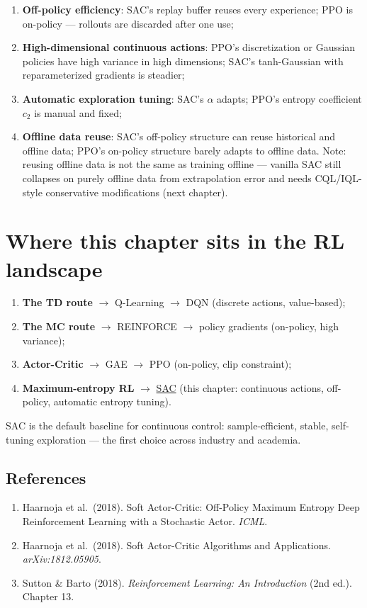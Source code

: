 \documentclass{article}
\begin{document}
\begin{enumerate}
  \item \textbf{Off-policy efficiency}: SAC's replay buffer reuses every experience; PPO is on-policy --- rollouts are discarded after one use;
  \item \textbf{High-dimensional continuous actions}: PPO's discretization or Gaussian policies have high variance in high dimensions; SAC's tanh-Gaussian with reparameterized gradients is steadier;
  \item \textbf{Automatic exploration tuning}: SAC's $\alpha$ adapts; PPO's entropy coefficient $c_2$ is manual and fixed;
  \item \textbf{Offline data reuse}: SAC's off-policy structure can reuse historical and offline data; PPO's on-policy structure barely adapts to offline data. Note: reusing offline data is not the same as training offline --- vanilla SAC still collapses on purely offline data from extrapolation error and needs CQL/IQL-style conservative modifications (next chapter).
\end{enumerate}

\section*{Where this chapter sits in the RL landscape}

\begin{enumerate}
  \item \textbf{The TD route} $\to$ Q-Learning $\to$ DQN (discrete actions, value-based);
  \item \textbf{The MC route} $\to$ REINFORCE $\to$ policy gradients (on-policy, high variance);
  \item \textbf{Actor-Critic} $\to$ GAE $\to$ PPO (on-policy, clip constraint);
  \item \textbf{Maximum-entropy RL} $\to$ \underline{SAC} (this chapter: continuous actions, off-policy, automatic entropy tuning).
\end{enumerate}

SAC is the default baseline for continuous control: sample-efficient, stable, self-tuning exploration --- the first choice across industry and academia.

\subsection*{References}

\begin{enumerate}
  \item Haarnoja et al.\ (2018). Soft Actor-Critic: Off-Policy Maximum Entropy Deep Reinforcement Learning with a Stochastic Actor. \textit{ICML}.
  \item Haarnoja et al.\ (2018). Soft Actor-Critic Algorithms and Applications. \textit{arXiv:1812.05905}.
  \item Sutton \& Barto (2018). \textit{Reinforcement Learning: An Introduction} (2nd ed.). Chapter 13.
\end{enumerate}
\end{document}
